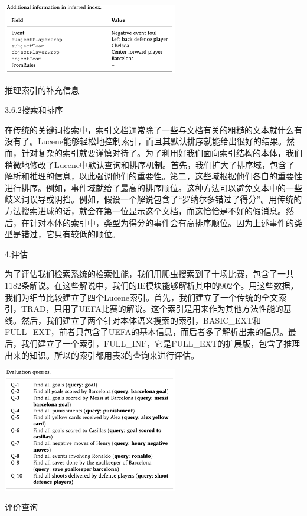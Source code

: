 	\begin{table}[htbp] 
	\centering\includegraphics[width=3in]{fig/trans/tab2.png} 
	\caption[]{推理索引的补充信息}
	\end{table} 
3.6.2搜索和排序

在传统的关键词搜索中，索引文档通常除了一些与文档有关的粗糙的文本就什么有没有了。{\Times Lucene}能够轻松地控制索引，而且其默认排序就能给出很好的结果。然而，针对复杂的索引就要谨慎对待了。为了利用好我们面向索引结构的本体，我们稍微地修改了{\Times Lucene}中默认查询和排序机制。首先，我们扩大了排序域，包含了解析和推理的信息，以此强调他们的重要性。第二，这些域根据他们各自的重要性进行排序。例如，事件域就给了最高的排序顺位。这种方法可以避免文本中的一些歧义词误导或阴挡。例如，假设一个解说包含了“罗纳尔多错过了得分”。用传统的方法搜索进球的话，就会在第一位显示这个文档，而这恰恰是不好的假消息。然后，在针对本体的索引中，类型为得分的事件会有高排序顺位。因为上述事件的类型是错过，它只有较低的顺位。

4.评估

为了评估我们检索系统的检索性能，我们用爬虫搜索到了十场比赛，包含了一共1182条解说。在这些解说中，我们的IE模块能够解析其中的902个。用这些数据，我们为细节比较建立了四个{\Times Lucene}索引。首先，我们建立了一个传统的全文索引，{\Times TRAD}，只用了{\Times UEFA}比赛的解说。这个索引是用来作为其他方法性能的基线。然后，我们建立了两个针对本体语义搜索的索引，{\Times BASIC\_EXT}和 {\Times FULL\_EXT}，前者只包含了{\Times UEFA}的基本信息，而后者多了解析出来的信息。最后，我们建立了一个索引，{\Times FULL\_INF}，它是{\Times FULL\_EXT}的扩展版，包含了推理出来的知识。所以的索引都用表3的查询来进行评估。
	\begin{table}[htbp] 
	\centering\includegraphics[width=3in]{fig/trans/tab3.png} 
	\caption[]{评价查询}
	\end{table} 

